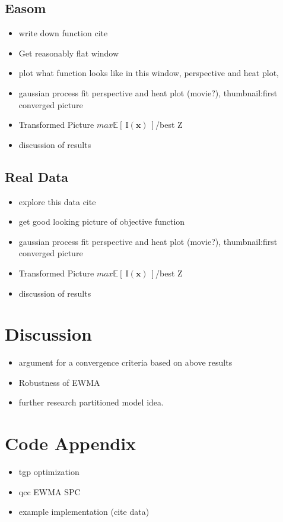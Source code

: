 \documentclass[12pt]{article}
\def \EIx {
	\mathbb{E}\left[~\text{I}(\bm{x})~\right]
}
\begin{document}
	\subsection{Easom}
		\begin{itemize}
		\item write down function {\color{red} cite}
		\item Get reasonably flat window 
		\item plot what function looks like in this window, perspective and heat plot,
		\item gaussian process fit perspective and heat plot {\color{red}(movie?), thumbnail:first converged picture}%
		\item Transformed Picture $max\EIx$/best Z
		\item discussion of results
		\end{itemize}
	
	\subsection{Real Data}
		\begin{itemize}
		\item explore this data {\color{red} cite}
		\item get good looking picture of objective function
		\item gaussian process fit perspective and heat plot {\color{red}(movie?), thumbnail:first converged picture}%
		\item Transformed Picture $max\EIx$/best Z
		\item discussion of results
		\end{itemize}

\section{Discussion}
	\begin{itemize}
	\item argument for a convergence criteria based on above results
	\item Robustness of EWMA \cite{boxBook}
	\item further research partitioned model idea.
	\end{itemize}
	
\section{Code Appendix}
	\begin{itemize}
	\item tgp optimization \cite{tgp2}
	\item qcc EWMA SPC \cite{qccPack}
	\item example implementation (cite data)
	\end{itemize}
	
\end{document}
